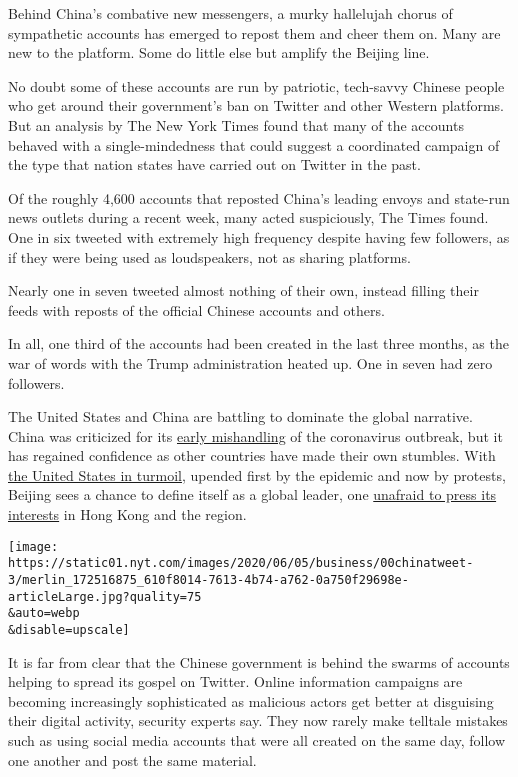 Behind China's combative new messengers, a murky hallelujah chorus of
sympathetic accounts has emerged to repost them and cheer them on. Many
are new to the platform. Some do little else but amplify the Beijing
line.

No doubt some of these accounts are run by patriotic, tech-savvy Chinese
people who get around their government's ban on Twitter and other
Western platforms. But an analysis by The New York Times found that many
of the accounts behaved with a single-mindedness that could suggest a
coordinated campaign of the type that nation states have carried out on
Twitter in the past.

Of the roughly 4,600 accounts that reposted China's leading envoys and
state-run news outlets during a recent week, many acted suspiciously,
The Times found. One in six tweeted with extremely high frequency
despite having few followers, as if they were being used as
loudspeakers, not as sharing platforms.

Nearly one in seven tweeted almost nothing of their own, instead filling
their feeds with reposts of the official Chinese accounts and others.

In all, one third of the accounts had been created in the last three
months, as the war of words with the Trump administration heated up. One
in seven had zero followers.

The United States and China are battling to dominate the global
narrative. China was criticized for its
\href{https://www.nytimes.com/2020/02/01/world/asia/china-coronavirus.html}{early
mishandling} of the coronavirus outbreak, but it has regained confidence
as other countries have made their own stumbles. With
\href{https://www.nytimes.com/2020/06/02/world/asia/china-george-floyd.html}{the
United States in turmoil}, upended first by the epidemic and now by
protests, Beijing sees a chance to define itself as a global leader, one
\href{https://www.nytimes.com/2020/05/24/world/asia/china-hong-kong-taiwan.html}{unafraid
to press its interests} in Hong Kong and the region.

\texttt{[image: https://static01.nyt.com/images/2020/06/05/business/00chinatweet-3/merlin\_172516875\_610f8014-7613-4b74-a762-0a750f29698e-articleLarge.jpg?quality=75\\\&auto=webp\\\&disable=upscale]}

It is far from clear that the Chinese government is behind the swarms of
accounts helping to spread its gospel on Twitter. Online information
campaigns are becoming increasingly sophisticated as malicious actors
get better at disguising their digital activity, security experts say.
They now rarely make telltale mistakes such as using social media
accounts that were all created on the same day, follow one another and
post the same material.

